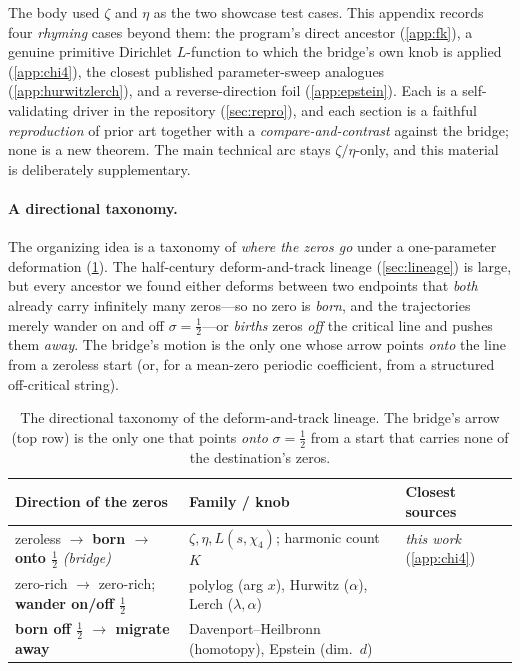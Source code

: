 \documentclass[11pt]{article}
\theoremstyle{definition}
\begin{document}
The body used $\zeta$ and $\eta$ as the two showcase test cases. This appendix
records four \emph{rhyming} cases beyond them: the program's direct ancestor
(\cref{app:fk}), a genuine primitive Dirichlet $L$-function to which the bridge's own
knob is applied (\cref{app:chi4}), the closest published parameter-sweep analogues
(\cref{app:hurwitzlerch}), and a reverse-direction foil (\cref{app:epstein}). Each is
a self-validating driver in the repository (\cref{sec:repro}), and each section is a
faithful \emph{reproduction} of prior art together with a \emph{compare-and-contrast}
against the bridge; none is a new theorem. The main technical arc stays
$\zeta/\eta$-only, and this material is deliberately supplementary.

\paragraph{A directional taxonomy.}
The organizing idea is a taxonomy of \emph{where the zeros go} under a one-parameter
deformation (\cref{tab:taxonomy}). The half-century deform-and-track lineage
(\cref{sec:lineage}) is large, but every ancestor we found either deforms between two
endpoints that \emph{both} already carry infinitely many zeros---so no zero is
\emph{born}, and the trajectories merely wander on and off $\sigma=\tfrac12$---or
\emph{births} zeros \emph{off} the critical line and pushes them \emph{away}. The
bridge's motion is the only one whose arrow points \emph{onto} the line from a
zeroless start (or, for a mean-zero periodic coefficient, from a structured
off-critical string).

\begin{table}[h]
  \centering
  \begin{tabularx}{\textwidth}{@{}lXl@{}}
    \toprule
    Direction of the zeros & Family / knob & Closest sources \\
    \midrule
    zeroless $\to$ \textbf{born $\to$ onto $\tfrac12$} \emph{(bridge)}
      & $\zeta,\eta,L(s,\chi_4)$; harmonic count $K$
      & \emph{this work} (\cref{app:chi4}) \\
    zero-rich $\to$ zero-rich; \textbf{wander on/off $\tfrac12$}
      & polylog (arg $x$), Hurwitz ($\alpha$), Lerch ($\lambda,\alpha$)
      & \citep{FornbergKolbig1975,GarunkstisSteuding2007,GarunkstisTamosiunas2017} \\
    \textbf{born off $\tfrac12$ $\to$ migrate away}
      & Davenport--Heilbronn (homotopy), Epstein (dim.\ $d$)
      & \citep{BalanzarioSanchezOrtiz2007,TravenecSamaj2022} \\
    \bottomrule
  \end{tabularx}
  \caption{The directional taxonomy of the deform-and-track lineage. The bridge's
  arrow (top row) is the only one that points \emph{onto} $\sigma=\tfrac12$ from a
  start that carries none of the destination's zeros.}
  \label{tab:taxonomy}
\end{table}
\end{document}
